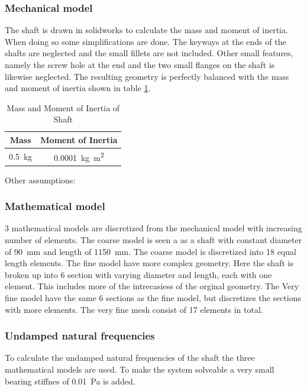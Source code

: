 \subsubsection{Mechanical model}
The shaft is drawn in solidworks to calculate the mass and moment of inertia. When doing so some simplifications are done.
The keyways at the ends of the shafts are neglected and the small fillets are not included. Other small features, namely the screw hole at the end and the two small flanges on the shaft is likewise neglected.
The resulting geometry is perfectly balanced with the mass and moment of inertia shown in table \ref{tab:shaft_mass_moment}.
\begin{table}[htbp]
    \centering
    \caption{Mass and Moment of Inertia of Shaft}
    \label{tab:shaft_mass_moment}
    \begin{tabular}{@{}cc@{}}
        \toprule
        Mass                    &   Moment of Inertia                       \\ \midrule
        \SI{0.5}{\kilo \gram}   &   \SI{0.0001}{\kilo \gram \square \meter} \\ \bottomrule
    \end{tabular}
\end{table}

Other assumptions:

\subsubsection{Mathematical model}
3 mathematical models are discretized from the mechanical model with increasing number of elements. The coarse model is seen a as a shaft with constant diameter of \SI{90}{\milli \meter} and length of \SI{1150}{\milli \meter}. The coarse model is discretized into 18 equal length elements.
The fine model have more complex geometry. Here the shaft is broken up into 6 section with varying diameter and length, each with one element. This includes more of the intrecasiess of the orginal geometry.
The Very fine model have the same 6 sections as the fine model, but discretizes the sections with more elements. The very fine mesh consist of 17 elements in total.

\subsubsection{Undamped natural frequencies}
To calculate the undamped natural frequencies of the shaft the three mathematical models are used. To make the system solveable a very small bearing stiffnes of \SI{0.01}{\pascal} is added.

